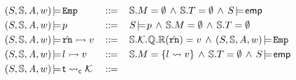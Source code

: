 \begin{figure*}[!t]
    \centering
    \vspace{-0.8em}
    \[
        \begin{array}{lcl}
            \asrtmodel{(\state, \hpstate, \primcom, \word)}
            {\empAst} & \define &
            \hpstate.\Mem = \emptyset \, \land \,
            \hpstate.\thrdpool = \emptyset \, \land \,
            \asrtmodel{\state}{\aemp} \\
            \\[-9pt]
            \asrtmodel{(\state, \hpstate, \primcom, \word)}{\astP}
            & \, \define \, &
            \asrtmodel{\state}{\astP} \, \land \,
            \hpstate.\Mem = \emptyset \, \land \,
            \hpstate.\thrdpool = \emptyset  \\
            \\[-9pt]
            \asrtmodel{(\state, \hpstate, \primcom, \word)}
                {\hregsto{\hrn}{\val}} & \define &
                \hpstate.\hthrdlocalst.\hRstate.\hRfile(\hrn)
                = \val \, \land \,
                \asrtmodel{(\state, \hpstate, \primcom, \word)}{\empAst}
            \\
            \\[-9pt]
            \asrtmodel{(\state, \hpstate, \primcom, \word)}
                {\hmsto{\loc}{\val}} & \define &
                \hpstate.\Mem = \{ \loc \rightsquigarrow \val \}
                \, \land \,
                \hpstate.\thrdpool = \emptyset \, \land \,
                \asrtmodel{\state}{\aemp} \\
            \\[-9pt]
            \asrtmodel{(\state, \hpstate, \primcom, \word)}
                {\astCurCont{\thrdid}{\hthrdlocalst}}
                & \define &

\end{array}\]
\end{figure*}
